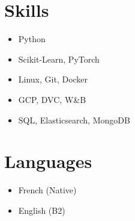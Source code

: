 \documentclass[a4paper,10pt]{article}
\begin{document}
\begin{adjustbox}{valign=t}
\begin{minipage}{0.3\textwidth}
        \section*{Skills}
        \raggedright
        \begin{itemize}
            \itemsep0em
            \item Python
            \item Scikit-Learn, PyTorch
            \item Linux, Git, Docker
            \item GCP, DVC, W\&B
            \item SQL, Elasticsearch, MongoDB
        \end{itemize}
        \vspace{-.5cm}
        \section*{Languages}
        \raggedright
        \begin{itemize}
            \itemsep0em
            \item French (Native)
            \item English (B2)
        \end{itemize}
        \vspace{-.5cm}
    \end{minipage}
\end{adjustbox}
\hfill
\begin{adjustbox}{valign=t}
    \begin{minipage}{0.02\textwidth}
        \MyVerticalRule
    \end{minipage}
\end{adjustbox}
\hfill
\end{document}
